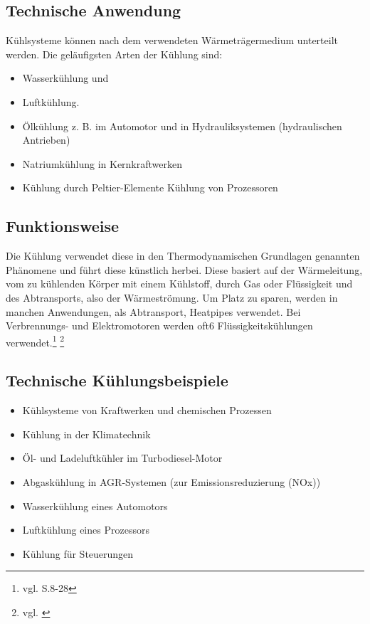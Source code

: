 \newpage

\subsection{Technische Anwendung}

Kühlsysteme können nach dem verwendeten Wärmeträgermedium unterteilt werden. Die geläufigsten Arten der Kühlung sind:

\begin{itemize}
	\item Wasserkühlung und
	\item Luftkühlung.
	\item Ölkühlung z.  B. im Automotor und in Hydrauliksystemen (hydraulischen Antrieben) 
	\item Natriumkühlung in Kernkraftwerken
	\item Kühlung durch Peltier-Elemente Kühlung von Prozessoren
\end{itemize}

\subsection{Funktionsweise}

Die Kühlung verwendet diese in den Thermodynamischen Grundlagen genannten Phänomene und führt diese künstlich herbei. Diese basiert auf der Wärmeleitung, vom zu kühlenden Körper mit einem Kühlstoff, durch Gas oder Flüssigkeit und des Abtransports, also der Wärmeströmung. Um Platz zu sparen, werden in manchen Anwendungen, als Abtransport, Heatpipes verwendet. Bei Verbrennungs- und Elektromotoren werden oft6 Flüssigkeitskühlungen verwendet.\footnote{vgl. \cite{Kuehlung1} S.8-28} \footnote{vgl. \cite{Kuehlung2}}

\subsection{Technische Kühlungsbeispiele}

\begin{itemize}
	\item Kühlsysteme von Kraftwerken und chemischen Prozessen
	\item Kühlung in der Klimatechnik
	\item Öl- und Ladeluftkühler im Turbodiesel-Motor
	\item Abgaskühlung in AGR-Systemen (zur Emissionsreduzierung (NOx))
	\item Wasserkühlung eines Automotors
	\item Luftkühlung eines Prozessors
	\item Kühlung für Steuerungen
\end{itemize}

